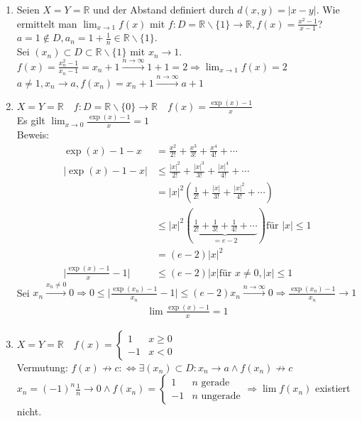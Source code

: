 \documentclass[ngerman,titlepage,twoside, parskip=half*]{scrreprt}
\newcommand*{\R}{\mathbb{R}}
\newcommand*{\perdef}{:\Leftrightarrow}
\theoremstyle{plain}
\theoremstyle{definition}
\theoremstyle{remark}
\newcommand*{\abs}[2][]{#1\lvert#2#1\rvert}
\begin{document}
\begin{enumerate}[(1)]
  \item Seien $X=Y=\R$ und der Abstand definiert durch $d(x,y)=\abs{x-y}$. Wie ermittelt man $\lim_{x\rightarrow 1} f(x)$
    mit $f\colon D=\R \backslash \{1\}\rightarrow \R, f(x)=\frac{x^2-1}{x-1}$? $a=1\notin D, a_n=1+\frac{1}{n} \in \R\backslash
    \{1\}$.\\
    Sei $(x_n)\subset D \subset \R \backslash \{1\}$ mit $x_n\rightarrow 1$.\\
    $f(x)=\frac{x_n^2 -1}{x_n-1}=x_n+1 \stackrel{n\rightarrow \infty}{\rightarrow} 1+1=2 \Rightarrow \lim_{x \rightarrow 1}
    f(x)=2$\\
    $a\neq 1, x_n\rightarrow a, f(x_n)=x_n+1 \stackrel{n \rightarrow \infty}{\rightarrow} a+1$
  \item $X=Y=\R \quad f\colon D=\R\backslash \{0\}\rightarrow \R \quad f(x)=\frac{\exp(x)-1}{x}$\\
    Es gilt $\lim_{x\rightarrow 0} \frac{\exp(x)-1}{x}=1$\\
    Beweis: 
    \begin{align*}
      \exp(x)-1-x &= \frac{x^2}{2!}+\frac{x^3}{3!}+\frac{x^4}{4!}+\cdots\\
      \abs{\exp(x)-1-x} &\leq \frac{\abs{x}^2}{2!}
      +\frac{\abs{x}^3}{3!} +\frac{\abs{x}^4}{4!}+\cdots\\
      &= \abs{x}^2\left(\frac{1}{2!} +\frac{\abs{x}}{3!}
        +\frac{\abs{x}^2}{4!} +\cdots\right)\\
      &\leq \abs{x}^2\left(\underbrace{\frac{1}{2!} +\frac{1}{3!}
          +\frac{1}{4!} +\cdots}_{=e-2}\right) \text{für } \abs{x}\leq 1\\
      &= (e-2)\abs{x}^2\\
      \abs{\frac{\exp(x)-1}{x}-1} &\leq (e-2)\abs{x} \text{für } x\neq
        0, \abs{x}\leq 1
    \end{align*}
    Sei $x_n\stackrel{x_n\neq 0}{\rightarrow} 0 \Rightarrow 0\leq \abs{\frac{\exp(x_n)-1}{x_n}-1}\leq (e-2)x_n
    \stackrel{n\rightarrow \infty}{\rightarrow} 0 \Rightarrow \frac{\exp(x_n)-1}{x_n}\rightarrow 1$
    \begin{gather*}\lim \frac{\exp(x)-1}{x}=1\end{gather*}
  \item $X=Y=\R \quad f(x)=\begin{cases}1 & x \geq 0\\-1 & x<0\end{cases}$\\
    Vermutung: $f(x)\not\rightarrow c \perdef \exists (x_n) \subset D\colon x_n\rightarrow a \wedge f(x_n)\not\rightarrow c$\\
    $x_n=(-1)^n\frac{1}{n}\rightarrow 0 \wedge f(x_n)=\begin{cases}1 & n \text{ gerade}\\-1 & n \text{ ungerade}\end{cases}
    \Rightarrow \lim f(x_n)$ existiert nicht.
\end{enumerate}
\end{document}
